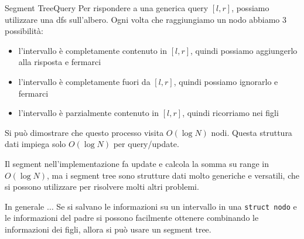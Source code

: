 \documentclass[compress]{beamer}
\begin{document}
\begin{frame}{Segment Tree}{Query}
    Per rispondere a una generica query $[l, r]$, possiamo utilizzare una dfs sull'albero. Ogni volta che raggiungiamo un nodo abbiamo $3$ possibilit\`a:\\
    \pause
    \begin{itemize}
        \item l'intervallo \`e completamente contenuto in $[l, r]$, quindi possiamo aggiungerlo alla risposta e fermarci
        \item l'intervallo \`e completamente fuori da $[l, r]$, quindi possiamo ignorarlo e fermarci
        \item l'intervallo \`e parzialmente contenuto in $[l, r]$, quindi ricorriamo nei figli
    \end{itemize}
    \pause
    Si pu\`o dimostrare che questo processo visita $O(\log N)$ nodi.
    \vfill
    \pause
    Questa struttura dati impiega solo $O(\log N)$ per query/update.
\end{frame}

\begin{frame}
\end{frame}

\begin{frame}
    Il segment nell'implementazione fa update e calcola la somma su range in $O(\log N)$, ma i segment tree sono strutture dati molto generiche e versatili, che si possono utilizzare per risolvere molti altri problemi.\\
    \pause
    \vfill
    \begin{block}{In generale $\dots$}
    Se si salvano le informazioni su un intervallo in una \texttt{struct nodo} e le informazioni del padre si possono facilmente ottenere combinando le informazioni dei figli, allora si pu\`o usare un segment tree.
    \end{block}
    \vfill
\end{frame}
\end{document}
